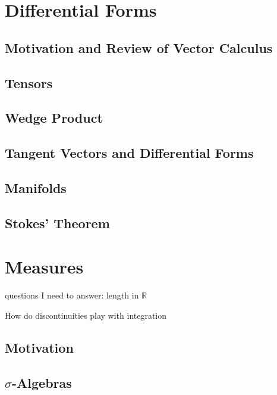 \documentclass{article}
\newcommand{\R}{\mathbb{R}}
\theoremstyle{definition}
\begin{document}
	\section{Differential Forms}
	\subsection{Motivation and Review of Vector Calculus}
	\subsection{Tensors}
	\subsection{Wedge Product}
	\subsection{Tangent Vectors and Differential Forms}
	\subsection{Manifolds}
	\subsection{Stokes' Theorem}
	\section{Measures}
	questions I need to answer: length in $ \R $
	
	How do discontinuities play with integration
	\subsection{Motivation}
	\subsection{$ \sigma $-Algebras}
\end{document}
